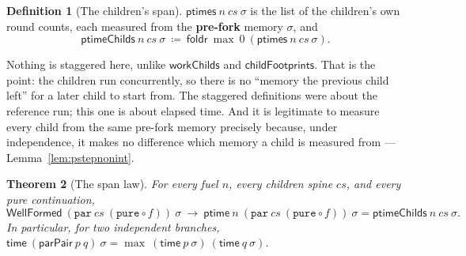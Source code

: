\documentclass[11pt,a4paper]{article}
\theoremstyle{definition}
\newtheorem{definition}{Definition}
\theoremstyle{plain}
\newtheorem{theorem}[definition]{Theorem}
\theoremstyle{remark}
\newcommand{\st}{\sigma}
\newcommand{\wf}{\mathsf{WellFormed}}
\newcommand{\spn}{\mathsf{time}}
\begin{document}
\begin{definition}[The children's span]\label{def:ptimechilds}
$\mathsf{ptimes}\ n\ cs\ \st$ is the list of the children's own round counts, each measured
from the \textbf{pre-fork} memory $\st$, and
\[
  \mathsf{ptimeChilds}\ n\ cs\ \st \ \coloneqq\ \mathsf{foldr}\ \max\ 0\ (\mathsf{ptimes}\ n\ cs\ \st) .
\]
\end{definition}

Nothing is staggered here, unlike $\mathsf{workChilds}$ and $\mathsf{childFootprints}$. That
is the point: the children run concurrently, so there is no ``memory the previous child left''
for a later child to start from. The staggered definitions were about the reference run; this
one is about elapsed time. And it is legitimate to measure every child from the same pre-fork
memory precisely because, under independence, it makes no difference which memory a child is
measured from --- Lemma~\ref{lem:pstepnonint}.

\begin{theorem}[The span law]\label{thm:max}
For every fuel $n$, every children spine $cs$, and every pure continuation,
\[
  \wf\ (\texttt{par}\ cs\ (\texttt{pure} \circ f))\ \st
  \ \longrightarrow\
  \mathsf{ptime}\ n\ (\texttt{par}\ cs\ (\texttt{pure} \circ f))\ \st
  = \mathsf{ptimeChilds}\ n\ cs\ \st .
\]
In particular, for two independent branches,
$\spn\ (\mathsf{parPair}\ p\ q)\ \st = \max\ (\spn\ p\ \st)\ (\spn\ q\ \st)$.
\end{theorem}
\end{document}
